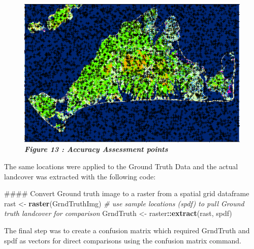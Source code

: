 \documentclass[]{article}
\newenvironment{Shaded}{\begin{snugshade}}{\end{snugshade}}
\newcommand{\KeywordTok}[1]{\textcolor[rgb]{0.13,0.29,0.53}{\textbf{#1}}}
\newcommand{\StringTok}[1]{\textcolor[rgb]{0.31,0.60,0.02}{#1}}
\newcommand{\CommentTok}[1]{\textcolor[rgb]{0.56,0.35,0.01}{\textit{#1}}}
\newcommand{\OperatorTok}[1]{\textcolor[rgb]{0.81,0.36,0.00}{\textbf{#1}}}
\newcommand{\NormalTok}[1]{#1}
\begin{document}
\begin{figure}
\centering
\includegraphics{images/Samples.png}
\caption{\textbf{\emph{Figure 13 : Accuracy Assessment points}}}
\end{figure}

The same locations were applied to the Ground Truth Data and the actual
landcover was extracted with the following code:

\begin{Shaded}
\begin{Highlighting}[]
\NormalTok{#### Convert Ground truth image to a raster from a spatial grid dataframe}
\NormalTok{rast <-}\StringTok{ }\KeywordTok{raster}\NormalTok{(GrndTruthImg)}
\CommentTok{# use sample locations (spdf) to pull Ground truth landcover for comparison}
\NormalTok{GrndTruth <-}\StringTok{ }\NormalTok{raster}\OperatorTok{::}\KeywordTok{extract}\NormalTok{(rast, spdf)}
\end{Highlighting}
\end{Shaded}

The final step was to create a confusion matrix which required GrndTruth
and spdf as vectors for direct comparisons using the confusion matrix
command.

\begin{Shaded}
\end{Shaded}
\end{document}
